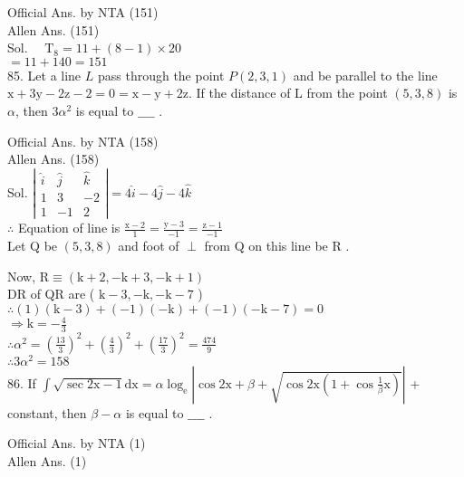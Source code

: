 \documentclass[10pt]{article}
\begin{document}
Official Ans. by NTA (151)\\
Allen Ans. (151)\\
Sol. \(\quad \mathrm{T}_{8}=11+(8-1) \times 20\)\\
\(=11+140=151\)\\
85. Let a line \(L\) pass through the point \(P(2,3,1)\) and be parallel to the line \(\mathrm{x}+3 \mathrm{y}-2 \mathrm{z}-2=0=\mathrm{x}-\mathrm{y}+2 \mathrm{z}\). If the distance of L from the point \((5,3,8)\) is \(\alpha\), then \(3 \alpha^{2}\) is equal to \(\_\_\_\_\) .

Official Ans. by NTA (158)\\
Allen Ans. (158)\\
Sol. \(\left|\begin{array}{ccc}\hat{i} & \hat{j} & \hat{k} \\ 1 & 3 & -2 \\ 1 & -1 & 2\end{array}\right|=4 \hat{i}-4 \hat{j}-4 \hat{k}\)\\
\(\therefore\) Equation of line is \(\frac{\mathrm{x}-2}{1}=\frac{\mathrm{y}-3}{-1}=\frac{\mathrm{z}-1}{-1}\)\\
Let Q be \((5,3,8)\) and foot of \(\perp\) from Q on this line be R .

Now, \(\mathrm{R} \equiv(\mathrm{k}+2,-\mathrm{k}+3,-\mathrm{k}+1)\)\\
DR of QR are ( \(\mathrm{k}-3,-\mathrm{k},-\mathrm{k}-7\) )\\
\(\therefore(1)(\mathrm{k}-3)+(-1)(-\mathrm{k})+(-1)(-\mathrm{k}-7)=0\)\\
\(\Rightarrow \mathrm{k}=-\frac{4}{3}\)\\
\(\therefore \alpha^{2}=\left(\frac{13}{3}\right)^{2}+\left(\frac{4}{3}\right)^{2}+\left(\frac{17}{3}\right)^{2}=\frac{474}{9}\)\\
\(\therefore 3 \alpha^{2}=158\)\\
86. If \(\int \sqrt{\sec 2 \mathrm{x}-1} \mathrm{dx}=\alpha \log _{\mathrm{e}}\left|\cos 2 \mathrm{x}+\beta+\sqrt{\cos 2 \mathrm{x}\left(1+\cos \frac{1}{\beta} \mathrm{x}\right)}\right|\) + constant, then \(\beta-\alpha\) is equal to \(\_\_\_\_\) .

Official Ans. by NTA (1)\\
Allen Ans. (1)
\end{document}
